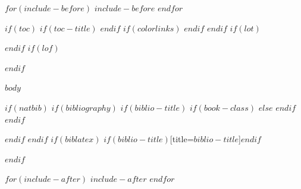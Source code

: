 \documentclass[12pt,a4paper,$for(classoption)$$classoption$$sep$,$endfor$]{$documentclass$}
\begin{document}
$for(include-before)$
$include-before$
$endfor$

$if(toc)$
{
$if(toc-title)$
\renewcommand*\contentsname{$toc-title$}
$endif$
$if(colorlinks)$
\hypersetup{linkcolor=$if(toccolor)$$toccolor$$else$black$endif$}
$endif$
\setcounter{tocdepth}{$toc-depth$}
\tableofcontents
}
$endif$
$if(lot)$
\listoftables
$endif$
$if(lof)$
\listoffigures
$endif$

$body$

$if(natbib)$
$if(bibliography)$
$if(biblio-title)$
$if(book-class)$
\renewcommand\bibname{$biblio-title$}
$else$
\renewcommand\refname{$biblio-title$}
$endif$
$endif$


$endif$
$endif$
$if(biblatex)$
\printbibliography$if(biblio-title)$[title=$biblio-title$]$endif$

$endif$

$for(include-after)$
$include-after$
$endfor$
\end{document}
